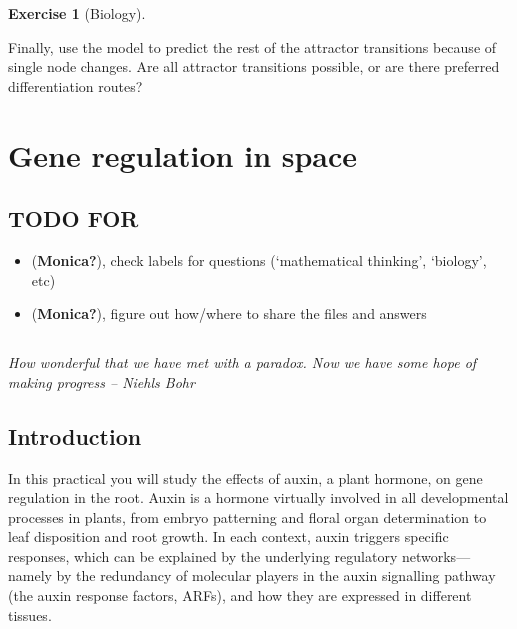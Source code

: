 \documentclass[
  letterpaper,
  DIV=11,
  numbers=noendperiod]{scrreprt}
\providecommand{\tightlist}{%
  \setlength{\itemsep}{0pt}\setlength{\parskip}{0pt}}\usepackage{longtable,booktabs,array}
\theoremstyle{definition}
\newtheorem{exercise}{Exercise}[chapter]
\theoremstyle{remark}
\begin{document}
\begin{exercise}[Biology]\protect\hypertarget{exr-non}{}\label{exr-non}

Finally, use the model to predict the rest of the attractor transitions
because of single node changes. Are all attractor transitions possible,
or are there preferred differentiation routes?

\end{exercise}

\chapter{Gene regulation in space}\label{gene-regulation-in-space}

\section{TODO FOR}\label{todo-for}

\begin{itemize}
\tightlist
\item
  (\textbf{Monica?}), check labels for questions (`mathematical
  thinking', `biology', etc)
\item
  (\textbf{Monica?}), figure out how/where to share the files and
  answers
\end{itemize}

\section*{}\label{section-1}

\markright{}

\emph{How wonderful that we have met with a paradox. Now we have some
hope of making progress -- Niehls Bohr}

\section{Introduction}\label{introduction-2}

In this practical you will study the effects of auxin, a plant hormone,
on gene regulation in the root. Auxin is a hormone virtually involved in
all developmental processes in plants, from embryo patterning and floral
organ determination to leaf disposition and root growth. In each
context, auxin triggers specific responses, which can be explained by
the underlying regulatory networks---namely by the redundancy of
molecular players in the auxin signalling pathway (the auxin response
factors, ARFs), and how they are expressed in different tissues.
\end{document}
